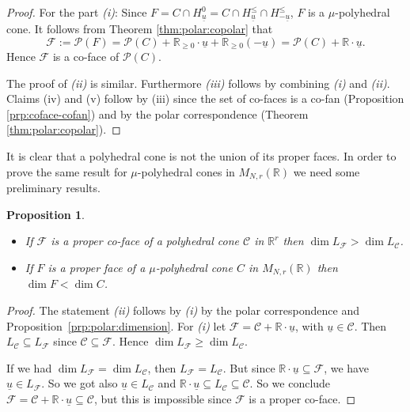 \documentclass[12pt, a4article]{amsart}   	%
\numberwithin{equation}{section}
\theoremstyle{plain}
\newtheorem{proposition}[theorem]{Proposition}
\theoremstyle{definition}
\newcommand{\R}{{\mathbb R}}
\newcommand{\mcC}{{\mathcal C}}
\newcommand{\mcF}{{\mathcal F}}
\newcommand{\mcP}{{\mathcal P}}
\newcommand{\uu}{{\underline u}}
\newcommand{\MNaR}{M_{N,r}(\R)}
\begin{document}
\begin{proof}
For the part \emph{(i)}: Since $F = C\cap H_{\uu}^0 = C\cap H_{\uu}^\leq\cap H_{-\uu}^\leq$, $F$ is a $\mu$-polyhedral cone. It follows from Theorem \ref{thm:polar:copolar} that 
$$\mcF := \mcP(F) = \mcP(C) + \R_{\geq 0}\cdot\uu + \R_{\geq 0}(-\uu) = \mcP(C) + \R\cdot\uu.$$
Hence $\mcF$ is a co-face of $\mcP(C)$. 

The proof of \emph{(ii)} is similar. Furthermore \emph{(iii)} follows by combining \emph{(i)} and \emph{(ii)}. Claims \textrm{(iv)} and \textrm{(v)} follow by \textrm{(iii)} since the set of co-faces is a co-fan (Proposition \ref{prp:coface-cofan}) and by the polar correspondence (Theorem \ref{thm:polar:copolar}).
\end{proof}

It is clear that a polyhedral cone is not the union of its proper faces. 
In order to prove the same result for $\mu$-polyhedral cones in $\MNaR$ we need some preliminary results.

\begin{proposition}\label{prp:dimension:proper}
    \begin{itemize}
        \item[(i)] If $\mcF$ is a proper co-face of a polyhedral cone $\mcC$ in $\R^r$ then $\dim L_\mcF > \dim L_\mcC$.
        \item[(ii)] If $F$ is a proper face of a $\mu$-polyhedral cone $C$ in $\MNaR$ then $\dim F < \dim C$.
    \end{itemize}
\end{proposition}
\begin{proof}
    The statement \emph{(ii)} follows  by \emph{(i)} by the polar correspondence and Proposition~\ref{prp:polar:dimension}. For \emph{(i)} let $\mcF = \mcC + \R\cdot\uu$, with $\uu\in\mcC$. Then $L_\mcC\subseteq L_\mcF$ since $\mcC\subseteq\mcF$. Hence $\dim L_\mcF\geq\dim L_\mcC$.
    
    If we had $\dim L_\mcF = \dim L_\mcC$, then $L_\mcF = L_\mcC$. But since $\R\cdot\uu\subseteq\mcF$, we have $\uu\in L_{\mcF}$. So we got also $\uu\in L_\mcC$ and $\R\cdot\uu\subseteq L_\mcC\subseteq\mcC$. So we conclude $\mcF = \mcC + \R\cdot\uu\subseteq\mcC$, but this is impossible since $\mcF$ is a proper co-face.
\end{proof}
\end{document}
